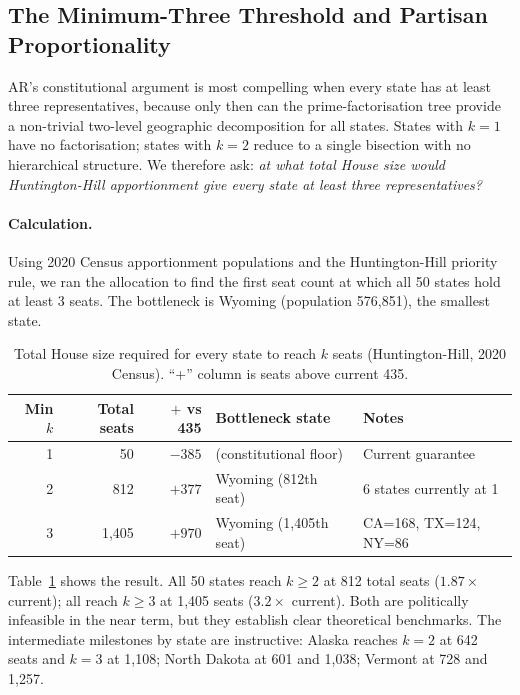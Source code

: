 \subsection{The Minimum-Three Threshold and Partisan Proportionality}
\label{sec:discussion:min3}

AR's constitutional argument is most compelling when every state has at least
three representatives, because only then can the prime-factorisation tree provide
a non-trivial two-level geographic decomposition for all states.
States with $k = 1$ have no factorisation; states with $k = 2$ reduce to a
single bisection with no hierarchical structure.
We therefore ask: \emph{at what total House size would Huntington-Hill
apportionment give every state at least three representatives?}

\paragraph{Calculation.}
Using 2020 Census apportionment populations and the Huntington-Hill priority
rule, we ran the allocation to find the first seat count at which all 50 states
hold at least 3 seats.
The bottleneck is Wyoming (population 576,851), the smallest state.

\begin{table}[h]
\centering
\caption{Total House size required for every state to reach $k$ seats
(Huntington-Hill, 2020 Census). ``+'' column is seats above current 435.}
\label{tab:min-seats}
\begin{tabular}{rrrll}
\toprule
Min $k$ & Total seats & $+$ vs 435 & Bottleneck state & Notes \\
\midrule
1 & 50  & $-385$ & (constitutional floor) & Current guarantee \\
2 & 812 & $+377$ & Wyoming (812th seat) & 6 states currently at 1 \\
3 & 1{,}405 & $+970$ & Wyoming (1{,}405th seat) & CA=168, TX=124, NY=86 \\
\bottomrule
\end{tabular}
\end{table}

\noindent Table~\ref{tab:min-seats} shows the result.
All 50 states reach $k \geq 2$ at 812 total seats ($1.87\times$ current);
all reach $k \geq 3$ at 1{,}405 seats ($3.2\times$ current).
Both are politically infeasible in the near term, but they establish clear
theoretical benchmarks.
The intermediate milestones by state are instructive:
Alaska reaches $k = 2$ at 642 seats and $k = 3$ at 1{,}108;
North Dakota at 601 and 1{,}038;
Vermont at 728 and 1{,}257.

